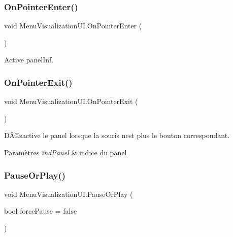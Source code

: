\subsubsection{\texorpdfstring{On\+Pointer\+Enter()}{OnPointerEnter()}}
{\footnotesize\ttfamily void Menu\+Visualization\+U\+I.\+On\+Pointer\+Enter (\begin{DoxyParamCaption}{ }\end{DoxyParamCaption})\hspace{0.3cm}{\ttfamily [inline]}}



Active panel\+Inf. 

\mbox{\label{class_menu_visualization_u_i_a6ebf2452335526b9d63b69ce420d2365}} 
\subsubsection{\texorpdfstring{On\+Pointer\+Exit()}{OnPointerExit()}}
{\footnotesize\ttfamily void Menu\+Visualization\+U\+I.\+On\+Pointer\+Exit (\begin{DoxyParamCaption}{ }\end{DoxyParamCaption})\hspace{0.3cm}{\ttfamily [inline]}}



DÃ©sactive le panel lorsque la souris n\textquotesingle{}est plus le bouton correspondant. 


\begin{DoxyParams}{Paramètres}
{\em ind\+Panel} & indice du panel\\
\hline
\end{DoxyParams}
\mbox{\label{class_menu_visualization_u_i_a9affc75173b7b9e70340b2b934398464}} 
\subsubsection{\texorpdfstring{Pause\+Or\+Play()}{PauseOrPlay()}}
{\footnotesize\ttfamily void Menu\+Visualization\+U\+I.\+Pause\+Or\+Play (\begin{DoxyParamCaption}\item[{bool}]{force\+Pause = {\ttfamily false} }\end{DoxyParamCaption})\hspace{0.3cm}{\ttfamily [inline]}}



